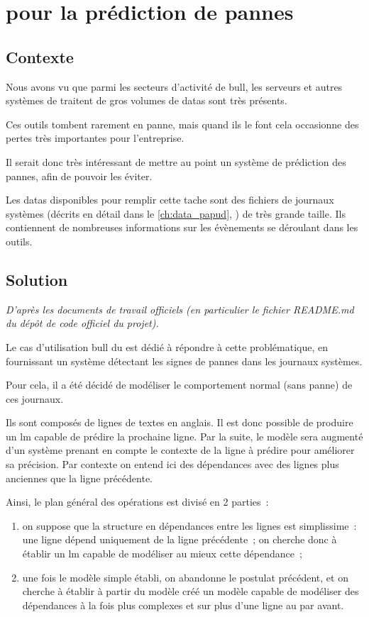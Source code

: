 \chapter{ pour la prédiction de pannes\label{ch:project_papud}}
\section{Contexte}
Nous avons vu que parmi les secteurs d'activité de \gls{bull}, les serveurs et autres systèmes de traitent de gros volumes de \glspl{data} sont très présents.

Ces outils tombent rarement en panne, mais quand ils le font cela occasionne des pertes très importantes pour l'entreprise.

Il serait donc très intéressant de mettre au point un système de prédiction des pannes, afin de pouvoir les éviter.

Les \glspl{data} disponibles pour remplir cette tache sont des fichiers de journaux systèmes (décrits en détail dans le \autoref{ch:data_papud}, ) de très grande taille.
Ils contiennent de nombreuses informations sur les évènements se déroulant dans les outils.

\section{Solution}\label{sec:solution}
\textit{D'après les documents de travail officiels (en particulier le fichier README.md du dépôt de code officiel du projet).} %

Le cas d'utilisation \gls{bull} du  est dédié à répondre à cette problématique, en fournissant un système détectant les signes de pannes dans les journaux systèmes.

Pour cela, il a été décidé de modéliser le comportement normal (sans panne) de ces journaux.

Ils sont composés de lignes de textes en anglais. Il est donc possible de produire un \gls{lm} capable de prédire la prochaine ligne.
Par la suite, le modèle sera augmenté d'un système prenant en compte le contexte de la ligne à prédire pour améliorer sa précision.
Par contexte on entend ici des dépendances avec des lignes plus anciennes que la ligne précédente.

Ainsi, le plan général des opérations est divisé en 2 parties~:
\begin{enumerate}
	\item on suppose que la structure en dépendances entre les lignes est simplissime~: une ligne dépend uniquement de la ligne précédente~; on cherche donc à établir un \gls{lm} capable de modéliser au mieux cette dépendance~;
	\item une fois le modèle simple établi, on abandonne le postulat précédent, et on cherche à établir à partir du modèle créé un modèle capable de modéliser des dépendances à la fois plus complexes et sur plus d'une ligne au par avant.
\end{enumerate}
\hspace{1em}

